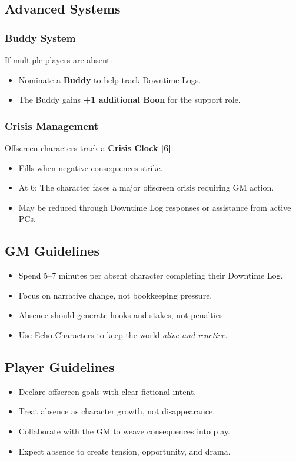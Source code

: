 \subsection{Advanced Systems}
\label{sec:mcs-advanced}

\subsubsection{Buddy System}
If multiple players are absent:
\begin{itemize}
    \item Nominate a \textbf{Buddy} to help track Downtime Logs.
    \item The Buddy gains \textbf{+1 additional Boon} for the support role.
\end{itemize}

\subsubsection{Crisis Management}
Offscreen characters track a \textbf{Crisis Clock [6]}:
\begin{itemize}
    \item Fills when negative consequences strike.
    \item At 6: The character faces a major offscreen crisis requiring GM action.
    \item May be reduced through Downtime Log responses or assistance from active PCs.
\end{itemize}

\subsection{GM Guidelines}
\label{sec:mcs-gm}
\begin{itemize}
    \item Spend 5–7 minutes per absent character completing their Downtime Log.
    \item Focus on narrative change, not bookkeeping pressure.
    \item Absence should generate hooks and stakes, not penalties.
    \item Use Echo Characters to keep the world \emph{alive and reactive}.
\end{itemize}

\subsection{Player Guidelines}
\label{sec:mcs-player}
\begin{itemize}
    \item Declare offscreen goals with clear fictional intent.
    \item Treat absence as character growth, not disappearance.
    \item Collaborate with the GM to weave consequences into play.
    \item Expect absence to create tension, opportunity, and drama.
\end{itemize}